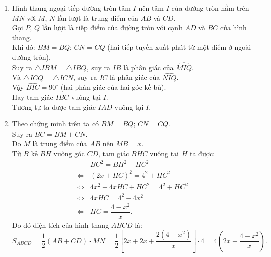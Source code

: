\begin{ex}
{ \begin{enumerate}
  \item Hình thang ngoại tiếp đường tròn tâm $I$ nên tâm $I$ của đường tròn nằm trên $MN$ với $M$, $N$ lần lượt là trung điểm của $AB$ và $CD$.\\
  Gọi $P$, $Q$ lần lượt là tiếp điểm của đường tròn với cạnh $AD$ và $BC$ của hình thang.\\
  Khi đó: $BM = BQ$; $CN = CQ$ (hai tiếp tuyến xuất phát từ một điểm ở ngoài đường tròn).\\
  Suy ra $\triangle IBM = \triangle IBQ$, suy ra $IB$ là phân giác của $\widehat{MIQ}$.\\
  Và $\triangle ICQ = \triangle ICN$, suy ra $IC$ là phân giác của $\widehat{NIQ}$.\\
  Vậy $\widehat{BIC} = 90^\circ$ (hai phân giác của hai góc kề bù).\\
  Hay tam giác $IBC$ vuông tại $I$.\\
  Tương tự ta được tam giác $IAD$ vuông tại $I$.
  \item Theo chứng minh trên ta có $BM = BQ$; $CN = CQ$.\\
  Suy ra $BC = BM + CN$.\\
  Do $M$ là trung điểm của $AB$ nên $MB = x$.\\
  Từ $B$ kẻ $BH$ vuông góc $CD$, tam giác $BHC$ vuông tại $H$ ta được:
  \begin{align*}
   				   & BC^2 = BH^2 + HC^2 \\
   \Leftrightarrow & (2x + HC)^2 = 4^2 + HC^2 \\
   \Leftrightarrow & 4x^2 + 4xHC + HC^2 = 4^2 + HC^2 \\
   \Leftrightarrow & 4xHC = 4^2 - 4x^2 \\
   \Leftrightarrow & HC = \dfrac{4 - x^2}{x}.
  \end{align*}
  Do đó diện tích của hình thang $ABCD$ là:
  $$ S_{ABCD} = \dfrac{1}{2}(AB + CD) \cdot MN = \dfrac{1}{2} \left[ 2x + 2x + \dfrac{2(4 - x^2)}{x} \right] \cdot 4 = 4 \left( 2x + \dfrac{4 - x^2}{x} \right).$$
 \end{enumerate}
 }
\end{ex}



